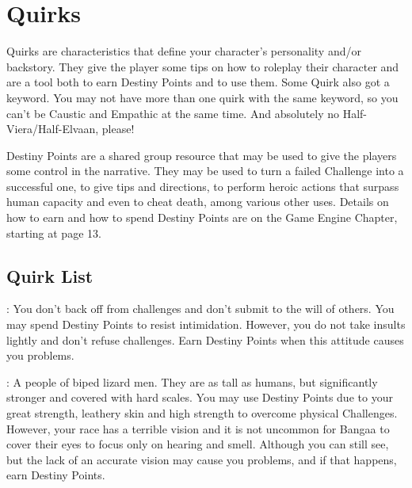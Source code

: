 \label{ch:characters}
\section{Quirks}\label{sec:quirks}
\begin{multicols}{2}
\begin{ffcolpage}
Quirks are characteristics that define your character's personality and/or backstory. They give the player some tips on how to roleplay their character and are a tool both to earn Destiny Points and to use them. Some Quirk also got a keyword. You may not have more than one quirk with the same keyword, so you can't be Caustic and Empathic at the same time. And absolutely no Half-Viera/Half-Elvaan, please! \pc

Destiny Points are a shared group resource that may be used to give the players some control in the narrative. They may be used to turn a failed Challenge into a successful one, to give tips and directions, to perform heroic actions that surpass human capacity and even to cheat death, among various other uses. Details on how to earn and how to spend Destiny Points are on the Game Engine Chapter, starting at page 13.
\end{ffcolpage}

\subsection{Quirk List}\label{subsec:quirklist}

\begin{ffcolpage}
: You don’t back off from challenges and don’t submit to the will of others. You may spend Destiny Points to resist intimidation. However, you do not take insults lightly and don’t refuse challenges. Earn Destiny Points when this attitude causes you problems.
\end{ffcolpage} \pw

\noindent{}
\begin{minipage}{.35\textwidth-2\columnsep}
: A people of biped lizard men. They are as tall as humans, but significantly stronger and covered with hard scales. You may use Destiny Points due to your great strength, leathery skin and high strength to overcome physical Challenges. However, your race has a terrible vision and it is not uncommon for Bangaa to cover their eyes to focus only on hearing and smell. Although you can still see, but the lack of an accurate vision may cause you problems, and if that happens, earn Destiny Points.
\end{minipage} \pw


\end{multicols}
